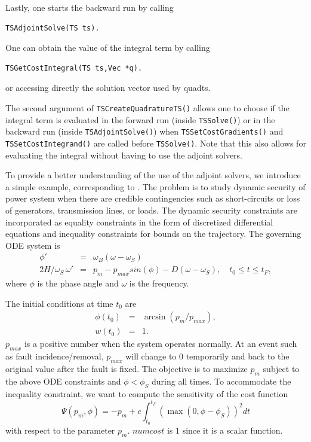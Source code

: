 Lastly, one starts the backward run by calling
\begin{lstlisting}
TSAdjointSolve(TS ts).
\end{lstlisting}

One can obtain the value of the integral term by calling
\begin{lstlisting}
TSGetCostIntegral(TS ts,Vec *q).
\end{lstlisting}
or accessing directly the solution vector used by quadts.

The second argument of \lstinline{TSCreateQuadratureTS()} allows one to choose if the integral term is evaluated in the forward run (inside \lstinline{TSSolve()}) or in the backward run (inside \lstinline{TSAdjointSolve()}) when \lstinline{TSSetCostGradients()} and \lstinline{TSSetCostIntegrand()} are called before \lstinline{TSSolve()}. Note that this also allows for evaluating the integral without having to use the adjoint solvers.

To provide a better understanding of the use of the adjoint solvers, we introduce a simple example, corresponding to \href{https://www.mcs.anl.gov/petsc/petsc-current/src/ts/tutorials/power_grid/ex3adj.c.html}{}.
The problem is to study dynamic security of power system when there are credible contingencies such as short-circuits or loss of generators, transmission lines, or loads.
The dynamic security constraints are incorporated as equality constraints in the form of discretized differential equations and inequality constraints for bounds on the trajectory.
The governing ODE system is
\begin{eqnarray*}
    \phi' &= &\omega_B (\omega - \omega_S)  \\
    2H/\omega_S \, \omega' & =& p_m - p_{max} sin(\phi) -D (\omega - \omega_S), \quad t_0 \leq t \leq t_F,
\end{eqnarray*}
where $\phi$ is the phase angle and $\omega$ is the frequency.

The initial conditions at time $t_0$ are
%
\begin{eqnarray*}
\phi(t_0) &=& \arcsin \left( p_m / p_{max} \right), \\
w(t_0) & =& 1.
\end{eqnarray*}
%
$p_{max}$ is a positive number when the system operates normally. At an event such as fault incidence/removal, $p_{max}$ will change to $0$ temporarily and back to the original value after the fault is fixed.
The objective is to maximize $p_m$ subject to the above ODE constraints and $\phi<\phi_S$ during all times.
To accommodate the inequality constraint, we want to compute the sensitivity of the cost function
%
\[
\Psi(p_m,\phi) = -p_m + c \int_{t_0}^{t_F} \left( \max(0, \phi - \phi_S ) \right)^2 dt
\]
%
with respect to the parameter $p_m$. $numcost$ is $1$ since it is a scalar function.

